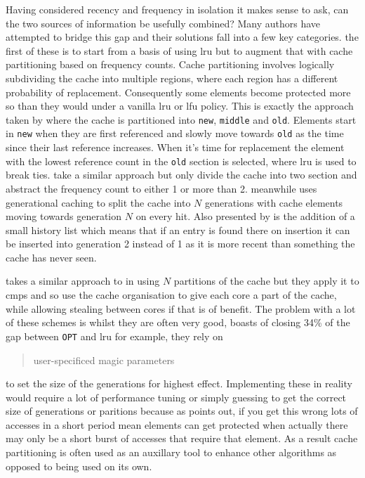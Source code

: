 Having considered recency and frequency in isolation it makes sense to ask, can the two sources of information be usefully combined? Many authors have attempted to bridge this gap and their solutions fall into a few key categories. the first of these is to start from a basis of using \gls{lru} but to augment that with cache partitioning based on frequency counts. Cache partitioning involves logically subdividing the cache into multiple regions, where each region has a different probability of replacement. Consequently some elements become protected more so than they would under a vanilla \gls{lru} or \gls{lfu} policy. This is exactly the approach taken by \citet{robinsonDataCacheManagement1990} where the cache is partitioned into \texttt{new}, \texttt{middle} and \texttt{old}. Elements start in \texttt{new} when they are first referenced and slowly move towards \texttt{old} as the time since their last reference increases. When it's time for replacement the element with the lowest reference count in the \texttt{old} section is selected, where \gls{lru} is used to break ties. \citet{karedlaCachingStrategiesImprove1994} take a similar approach but only divide the cache into two section and abstract the frequency count to either 1 or more than 2. \citet{osawaGenerationalReplacementSchemes1997} meanwhile uses generational caching to split the cache into $N$ generations with cache elements moving towards generation $N$ on every hit. Also presented by \citeauthor{osawaGenerationalReplacementSchemes1997} is the addition of a small history list which means that if an entry is found there on insertion it can be inserted into generation 2 instead of 1 as it is more recent than something the cache has never seen. 

\citet{juanImprovedMulticoreShared2012} takes a similar approach to \citeauthor{osawaGenerationalReplacementSchemes1997} in using $N$ partitions of the cache but they apply it to \gls{cmp}s and so use the cache organisation to give each core a part of the cache, while allowing stealing between cores if that is of benefit. The problem with a lot of these schemes is whilst they are often very good, \citet{robinsonDataCacheManagement1990} boasts of closing 34\% of the gap between \texttt{OPT} and \gls{lru} for example, they rely on  \blockcquote{bansalCARClockAdaptive2004}{user-specificed magic parameters} to set the size of the generations for highest effect. Implementing these in reality would require a lot of performance tuning or simply guessing to get the correct size of generations or paritions because as \citeauthor{osawaGenerationalReplacementSchemes1997} points out, if you get this wrong lots of accesses in a short period mean elements can get protected when actually there may only be a short burst of accesses that require that element. As a result cache partitioning is often used as an auxillary tool to enhance other algorithms as opposed to being used on its own.

